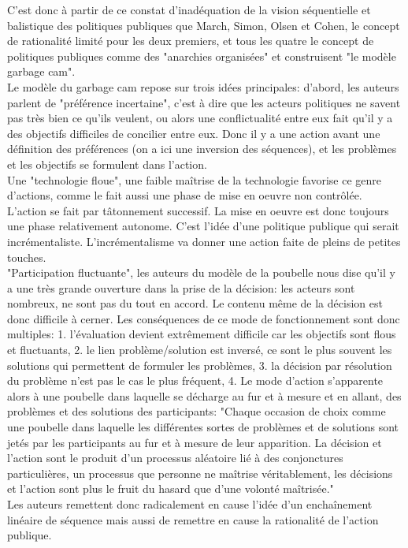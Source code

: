 \documentclass[10pt, a4paper, openany]{book}
\begin{document}
C'est donc à partir de ce constat d'inadéquation de la vision séquentielle et balistique des politiques publiques que March, Simon, Olsen et Cohen, le concept de rationalité limité pour les deux premiers, et tous les quatre le concept de politiques publiques comme des "anarchies organisées" et construisent "le modèle garbage cam". \\
Le modèle du garbage cam repose sur trois idées principales: d'abord, les auteurs parlent de "préférence incertaine", c'est à dire que les acteurs politiques ne savent pas très bien ce qu'ils veulent, ou alors une conflictualité entre eux fait qu'il y a des objectifs difficiles de concilier entre eux. Donc il y a une action avant une définition des préférences (on a ici une inversion des séquences), et les problèmes et les objectifs se formulent dans l'action. \\
Une "technologie floue", une faible maîtrise de la technologie favorise ce genre d'actions, comme le fait aussi une phase de mise en oeuvre non contrôlée. L'action se fait par tâtonnement successif. La mise en oeuvre est donc toujours une phase relativement autonome. C'est l'idée d'une politique publique qui serait incrémentaliste. L'incrémentalisme va donner une action faite de pleins de petites touches. \\
"Participation fluctuante", les auteurs du modèle de la poubelle nous dise qu'il y a une très grande ouverture dans la prise de la décision: les acteurs sont nombreux, ne sont pas du tout en accord. Le contenu même de la décision est donc difficile à cerner. Les conséquences de ce mode de fonctionnement sont donc multiples: 1. l'évaluation devient extrêmement difficile car les objectifs sont flous et fluctuants, 2. le lien problème/solution est inversé, ce sont le plus souvent les solutions qui permettent de formuler les problèmes, 3. la décision par résolution du problème n'est pas le cas le plus fréquent, 4. Le mode d'action s'apparente alors à une poubelle dans laquelle se décharge au fur et à mesure et en allant, des problèmes et des solutions des participants: "Chaque occasion de choix comme une poubelle dans laquelle les différentes sortes de problèmes et de solutions sont jetés par les participants au fur et à mesure de leur apparition. La décision et l'action sont le produit d'un processus aléatoire lié à des conjonctures particulières, un processus que personne ne maîtrise véritablement, les décisions et l'action sont plus le fruit du hasard que d'une volonté maîtrisée." \\
Les auteurs remettent donc radicalement en cause l'idée d'un enchaînement linéaire de séquence mais aussi de remettre en cause la rationalité de l'action publique. 
\end{document}
